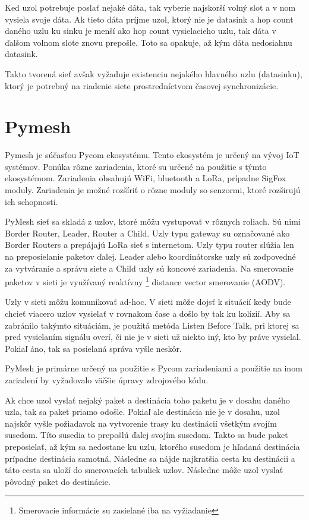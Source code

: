 \documentclass[slovak,master]{diploma}
\begin{document}
Ked uzol potrebuje poslať nejaké dáta, tak vyberie najskorší volný slot a v nom vysiela svoje dáta. Ak tieto dáta príjme uzol, ktorý nie je datasink a 
hop count daného uzlu ku sinku je menší ako hop count vysielacieho uzlu, tak dáta v ďalšom volnom slote znovu prepošle. Toto sa opakuje, až 
kým dáta nedosiahnu datasink.

Takto tvorená sieť avšak vyžaduje existenciu nejakého hlavného uzlu (datasinku), ktorý je potrebný na riadenie siete prostredníctvom časovej synchronizácie.

\section{Pymesh}
Pymesh je súčasťou Pycom \cite{pycom} ekosystému. Tento ekosystém je určený na vývoj IoT systémov. Ponúka rôzne zariadenia, ktoré su určené na použitie s týmto 
ekosystémom. Zariadenia obsahujú WiFi, bluetooth a LoRa, prípadne SigFox moduly. Zariadenia je možné rozšíriť o rôzne moduly so senzormi, ktoré rozširujú ich schopnosti.

PyMesh sieť sa skladá z uzlov, ktoré môžu vystupovať v rôznych roliach. Sú nimi Border Router, Leader, Router a Child. Uzly typu gateway su označované ako Border Routers a prepájajú LoRa sieť s 
internetom. Uzly typu router slúžia len na preposielanie paketov ďalej. Leader alebo koordinátorske uzly sú zodpovedné za vytváranie a správu siete a Child uzly sú koncové 
zariadenia. Na smerovanie paketov v sieti je využívaný reaktívny \footnote[1]{Smerovacie informácie su zasielané iba na vyžiadanie} distance vector smerovanie (AODV).

Uzly v sieti môžu komunikovať ad-hoc. V sieti môže dojsť k situácií kedy bude chcieť viacero uzlov vysielať v rovnakom čase a došlo by tak ku kolízií.
Aby sa zabránilo takýmto situáciám, je použitá metóda Listen Before Talk, pri ktorej sa pred vysielaním signálu overí, či nie je v sieti už niekto iný, kto by práve 
vysielal. Pokiaľ áno, tak sa posielaná správa vyšle neskôr.

PyMesh je primárne určený na použitie s Pycom zariadeniami a použitie na inom zariadení by vyžadovalo väčšie úpravy zdrojového kódu.

Ak chce uzol vyslať nejaký paket a destinácia toho paketu je v dosahu daného uzla, tak sa paket priamo odošle. 
Pokiaľ ale destinácia nie je v dosahu, uzol najskôr vyšle požiadavok na vytvorenie trasy ku destinácií všetkým svojím susedom. Títo susedia to prepošlú ďalej svojím susedom. 
Takto sa bude paket preposielať, až kým sa nedostane ku uzlu, ktorého susedom je hľadaná destinácia prípadne destinácia samotná. Následne sa nájde najkratšia cesta ku destinácii a táto cesta sa uloží do smerovacích 
tabuliek uzlov. Následne môže uzol vyslať pôvodný paket do destinácie.
\end{document}
